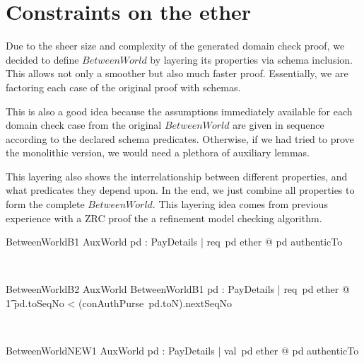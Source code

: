 \section{Constraints on the ether}\label{ch5.betweenworld}

Due to the sheer size and complexity of the generated domain check proof,
we decided to define $BetweenWorld$ by layering its properties via schema
inclusion. This allows not only a smoother but also much faster proof.
Essentially, we are factoring each case of the original proof with schemas.

This is also a good idea because the assumptions immediately available for
each domain check case from the original $BetweenWorld$ are given
in sequence according to the declared schema predicates. Otherwise, if we
had tried to prove the monolithic version, we would need a plethora of auxiliary
lemmas.

This layering also shows the interrelationship between different properties,
and what predicates they depend upon. In the end, we just combine all properties
to form the complete $BetweenWorld$. This layering idea comes from previous
experience with a ZRC proof the a refinement model checking algorithm.

\begin{LNewSDef}
\begin{schema}{BetweenWorldB1}
   AuxWorld
\where
   \forall pd : PayDetails | req~pd \in ether @ pd \in authenticTo
\end{schema}~\end{LNewSDef}

\begin{LNewSDef}
\begin{schema}{BetweenWorldB2}
   AuxWorld
\where
   BetweenWorldB1
   \also
   \forall pd : PayDetails | req~pd \in ether @
  \\ %
  \t1 pd.toSeqNo < (conAuthPurse~pd.toN).nextSeqNo
\end{schema}~\end{LNewSDef}

\begin{LNewSDef}
\begin{schema}{BetweenWorldNEW1}
   AuxWorld
\where
   \forall pd : PayDetails | val~pd \in ether @ pd \in authenticTo
\end{schema}~\end{LNewSDef}


